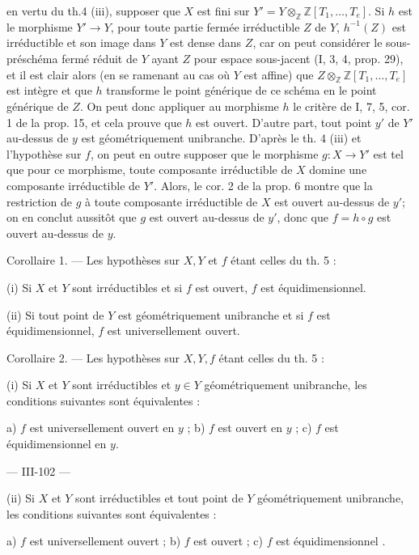 en vertu du th.4 (iii), supposer que $X$ est fini sur $Y' = Y \otimes_{\mathbb{Z}} \mathbb{Z}[T_1, \dots, T_e]$. Si $h$ est le morphisme $Y' \to Y$, pour toute partie fermée irréductible $Z$ de $Y$, $h^{-1}(Z)$ est irréductible et son image dans $Y$ est dense dans $Z$, car on peut considérer le sous-préschéma fermé réduit de $Y$ ayant $Z$ pour espace sous-jacent (I, 3, 4, prop. 29), et il est clair alors (en se ramenant au cas où $Y$ est affine) que $Z \otimes_{\mathbb{Z}} \mathbb{Z}[T_1, \dots, T_e]$ est intègre et que $h$ transforme le point générique de ce schéma en le point générique de $Z$. On peut donc appliquer au morphisme $h$ le critère de I, 7, 5, cor. 1 de la prop. 15, et cela prouve que $h$ est ouvert. D'autre part, tout point $y'$ de $Y'$ au-dessus de $y$ est géométriquement unibranche. D'après le th. 4 (iii) et l'hypothèse sur $f$, on peut en outre supposer que le morphisme $g : X \to Y'$ est tel que pour ce morphisme, toute composante irréductible de $X$ domine une composante irréductible de $Y'$. Alors, le cor. 2 de la prop. 6 montre que la restriction de $g$ à toute composante irréductible de $X$ est ouvert au-dessus de $y'$; on en conclut aussitôt que $g$ est ouvert au-dessus de $y'$, donc que $f=h \circ g$ est ouvert au-dessus de $y$.

Corollaire 1. — Les hypothèses sur $X, Y$ et $f$ étant celles du th. 5 :

(i) Si $X$ et $Y$ sont irréductibles et si $f$ est ouvert, $f$ est équidimensionnel.

(ii) Si tout point de $Y$ est géométriquement unibranche et si $f$ est équidimensionnel, $f$ est universellement ouvert.

Corollaire 2. — Les hypothèses sur $X, Y, f$ étant celles du th. 5 :

(i) Si $X$ et $Y$ sont irréductibles et $y \in Y$ géométriquement unibranche, les conditions suivantes sont équivalentes :

a) $f$ est universellement ouvert en $y$ ; b) $f$ est ouvert en $y$ ; c) $f$ est équidimensionnel en $y$.

\newpage


--- III-102 ---

(ii) Si $X$ et $Y$ sont irréductibles et tout point de $Y$ géométriquement unibranche, les conditions suivantes sont équivalentes :

a) $f$ est universellement ouvert ; b) $f$ est ouvert ; c) $f$ est équidimensionnel .

